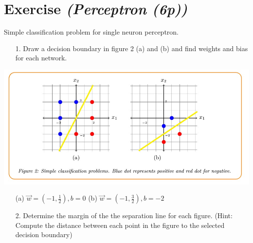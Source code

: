 \documentclass{article}
\begin{document}
\section{Exercise \textit{(Perceptron (6p))}}
Simple classification problem for single neuron perceptron.
\begin{itemize}
	\item [1.] Draw a decision boundary in figure 2 (a) and (b) and find weights and bias for each network. \\
\end{itemize}
	\includegraphics[scale = 0.4]{dots}	 \\
	\begin{itemize}
		\item [(a)] $\vec{w} = (-1 ,\frac{1}{2}) , b = 0$ (b) $\vec{w} = (-1 , \frac{3}{2}) , b = -2$
	\end{itemize}
\begin{itemize}
	\item [2.] Determine the margin of the the separation line for each figure. (Hint: Compute the
distance between each point in the figure to the selected decision boundary)
\end{itemize}
\color{black}
\footnotesize
\end{document}
